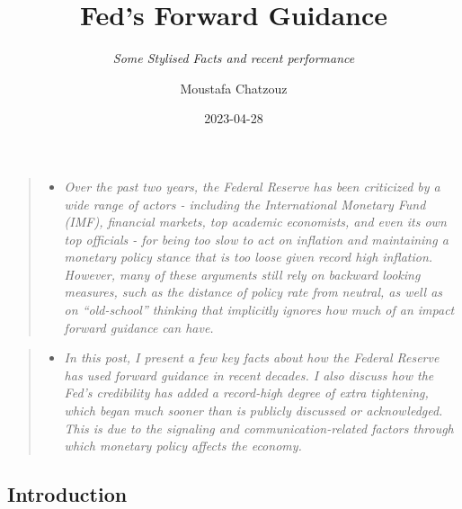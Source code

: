 \documentclass[
  letterpaper,
  DIV=11,
  numbers=noendperiod]{scrartcl}
\title{Fed's Forward Guidance}
\subtitle{\emph{Some Stylised Facts and recent performance}}
\author{Moustafa Chatzouz}
\date{2023-04-28}
\providecommand{\tightlist}{%
  \setlength{\itemsep}{0pt}\setlength{\parskip}{0pt}}\usepackage{longtable,booktabs,array}
\renewcommand*\contentsname{Table of contents}
\newcommand\contentsname{Table of contents}
\begin{document}
\maketitle
\ifdefined\Shaded\renewenvironment{Shaded}{\begin{tcolorbox}[boxrule=0pt, interior hidden, enhanced, breakable, frame hidden, borderline west={3pt}{0pt}{shadecolor}, sharp corners]}{\end{tcolorbox}}\fi

\renewcommand*\contentsname{Table of contents}
{
\hypersetup{linkcolor=}
\setcounter{tocdepth}{3}
\tableofcontents
}
\begin{quote}
\begin{itemize}
\tightlist
\item
  \emph{Over the past two years, the Federal Reserve has been criticized
  by a wide range of actors - including the International Monetary Fund
  (IMF), financial markets, top academic economists, and even its own
  top officials - for being too slow to act on inflation and maintaining
  a monetary policy stance that is too loose given record high
  inflation. However, many of these arguments still rely on backward
  looking measures, such as the distance of policy rate from neutral, as
  well as on ``old-school'' thinking that implicitly ignores how much of
  an impact forward guidance can have.}
\end{itemize}
\end{quote}

\begin{quote}
\begin{itemize}
\tightlist
\item
  \emph{In this post, I present a few key facts about how the Federal
  Reserve has used forward guidance in recent decades. I also discuss
  how the Fed's credibility has added a record-high degree of extra
  tightening, which began much sooner than is publicly discussed or
  acknowledged. This is due to the signaling and communication-related
  factors through which monetary policy affects the economy.}
\end{itemize}
\end{quote}

\hypertarget{introduction}{%
\subsection{Introduction}\label{introduction}}
\end{document}
